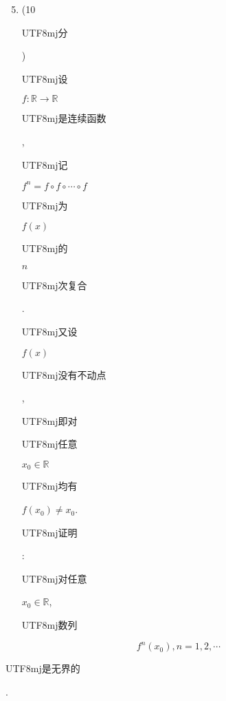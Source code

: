 \documentclass[10pt]{article}
\begin{document}
\begin{enumerate}
  \setcounter{enumi}{4}
  \item (10 \begin{CJK}{UTF8}{mj}分\end{CJK}) \begin{CJK}{UTF8}{mj}设\end{CJK} $f: \mathbb{R} \rightarrow \mathbb{R}$ \begin{CJK}{UTF8}{mj}是连续函数\end{CJK}, \begin{CJK}{UTF8}{mj}记\end{CJK} $f^{n}=f \circ f \circ \cdots \circ f$ \begin{CJK}{UTF8}{mj}为\end{CJK} $f(x)$ \begin{CJK}{UTF8}{mj}的\end{CJK} $n$ \begin{CJK}{UTF8}{mj}次复合\end{CJK}. \begin{CJK}{UTF8}{mj}又设\end{CJK} $f(x)$ \begin{CJK}{UTF8}{mj}没有不动点\end{CJK}, \begin{CJK}{UTF8}{mj}即对\end{CJK} \begin{CJK}{UTF8}{mj}任意\end{CJK} $x_{0} \in \mathbb{R}$ \begin{CJK}{UTF8}{mj}均有\end{CJK} $f\left(x_{0}\right) \neq x_{0}$. \begin{CJK}{UTF8}{mj}证明\end{CJK}: \begin{CJK}{UTF8}{mj}对任意\end{CJK} $x_{0} \in \mathbb{R}$, \begin{CJK}{UTF8}{mj}数列\end{CJK}
\end{enumerate}
$$
f^{n}\left(x_{0}\right), n=1,2, \cdots
$$
\begin{CJK}{UTF8}{mj}是无界的\end{CJK}.
\end{document}
